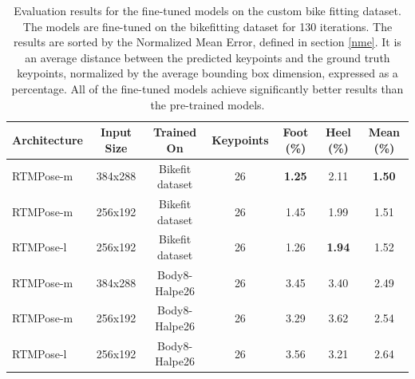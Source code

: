 \begin{table}[htbp]
    \setlength{\tabcolsep}{4pt}
    \centering
    \begin{tabular}{l cccccc}
        \toprule
        Architecture & Input Size & Trained On      & Keypoints & Foot (\%)     & Heel (\%)     & Mean (\%)     \\
        \midrule
        RTMPose-m    & 384x288    & Bikefit dataset & 26        & \textbf{1.25} & 2.11          & \textbf{1.50} \\
        RTMPose-m    & 256x192    & Bikefit dataset & 26        & 1.45          & 1.99          & 1.51          \\
        RTMPose-l    & 256x192    & Bikefit dataset & 26        & 1.26          & \textbf{1.94} & 1.52          \\
        RTMPose-m    & 384x288    & Body8-Halpe26   & 26        & 3.45          & 3.40          & 2.49          \\
        RTMPose-m    & 256x192    & Body8-Halpe26   & 26        & 3.29          & 3.62          & 2.54          \\
        RTMPose-l    & 256x192    & Body8-Halpe26   & 26        & 3.56          & 3.21          & 2.64          \\
        \bottomrule
    \end{tabular}
    \caption{Evaluation results for the fine-tuned models on the custom bike fitting dataset. The models are fine-tuned on the bikefitting dataset for 130 iterations. The results are sorted by the Normalized Mean Error, defined in section \ref{nme}. It is an average distance between the predicted keypoints and the ground truth keypoints, normalized by the average bounding box dimension, expressed as a percentage. All of the fine-tuned models achieve significantly better results than the pre-trained models.}
    \label{tab:finetune_results}

\end{table}

